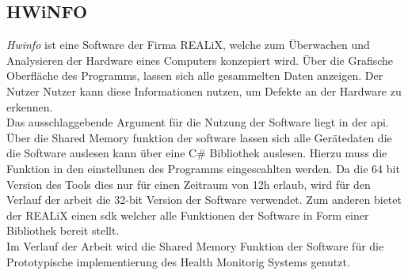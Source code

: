 \subsection{HWiNFO}\label{sec:HWiNFO}
\textit{Hwinfo} ist eine Software der Firma REALiX, welche zum Überwachen und Analysieren der Hardware eines Computers konzepiert wird. Über die Grafische Oberfläche des Programms, lassen sich alle gesammelten Daten anzeigen. Der Nutzer Nutzer kann diese Informationen nutzen, um Defekte an der Hardware zu erkennen.\\
Das ausschlaggebende Argument für die Nutzung der Software liegt in der \ac{api}. Über die Shared Memory funktion der software lassen sich alle Gerätedaten die die Software auslesen kann über eine C\# Bibliothek auslesen. Hierzu muss die Funktion in den einstellunen des Programms eingescahlten werden. Da die 64 bit Version des Tools dies nur für einen Zeitraum von 12h erlaub, wird für den Verlauf der arbeit die 32-bit Version der Software verwendet. Zum anderen bietet der REALiX einen \ac{sdk} welcher alle Funktionen der Software in Form einer Bibliothek bereit stellt.\cite{HWINFO}\\
Im Verlauf der Arbeit wird die Shared Memory Funktion der Software für die Prototypische implementierung des Health Monitorig Systems genutzt.   